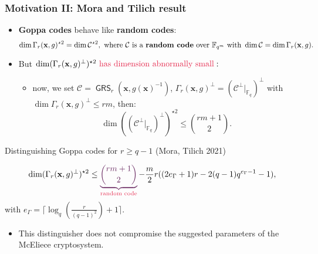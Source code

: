 \documentclass[
10pt, %
%
aspectratio=169, %
]{beamer}
\theoremstyle{plain}%
\theoremstyle{definition}
\theoremstyle{remark}
\newcommand{\calC}{\mathcal{C}}
\newcommand{\fqm}{\mathbb{F}_{q^m}}
\newcommand{\fq}{\mathbb{F}_{q}}
\newcommand{\GRS}{\operatorname{\mathsf{GRS}}}
\begin{document}
	\begin{frame}
		\frametitle{Motivation II: Mora and Tilich result }
		\begin{itemize}
			\item \textbf{Goppa codes} behave like \textbf{random codes}:
			\vspace{-0.7em}
			$$\dim \Gamma_r(\mathbf{x},g)^{\star 2}= \dim \calC^{\star 2}, \text{ where }\calC \text{ is a \textbf{random code} over $\fqm$ with }
			\dim \calC=\dim \Gamma_r(\mathbf{x},g).$$
			\item But $ \dim(\Gamma_r(\mathbf{x},g)^{\perp})^{\star 2}  \text{ \textcolor{amaranth}{ has dimension abnormally small}}:$
			\begin{itemize}
				\item now, we set $\calC=\GRS_r(\mathbf{x},g(\mathbf{x})^{-1})$,  $\Gamma_r(\mathbf{x},g)^{\perp}=(\calC^\perp|_{\fq})^{\perp}$ with $\dim \Gamma_r(\mathbf{x},g)^{\perp} \leq rm$, then: 
				$$\dim ((\calC^\perp|_{\fq})^{\perp})^{\star 2}\leq \binom{rm+1}{2}.$$
			\end{itemize}
			
			 
		\end{itemize}
			
			
		
		
		\begin{block}{Distinguishing Goppa codes for $r \geq q-1$ (Mora, Tilich 2021)}
			
			\[\dim(\Gamma_r(\mathbf{x},g)^{\perp})^{\star 2}\leq \mathcolor{palatinatepurple}{\underbrace{\binom{rm+1}{2}}}_{\text{\textcolor{amaranth}{random code}}}  - \frac{m}{2}r((2e_{\Gamma}+1)r - 2(q-1)q^{e_{\Gamma}-1}-1),\]
			with $e_{\Gamma}= \lceil\log_q(\frac{r}{(q - 1)^2})+1\rceil$.
		\end{block}
	\begin{itemize}
		\vspace{-0.7em}
		\item[\large\ding{43}] This distinguisher does not compromise the suggested parameters of the McEliece cryptosystem.
	\end{itemize}		

	\end{frame}
\end{document}
